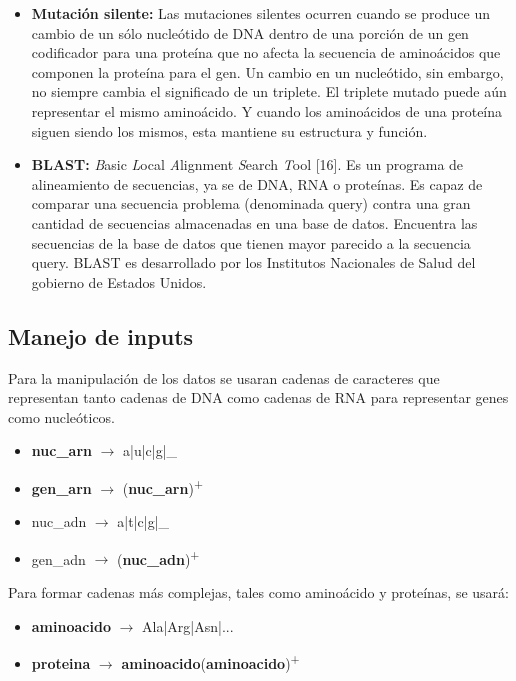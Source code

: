 \documentclass[12pt,a4paper,english,spanish]{article}
\begin{document}
\begin{itemize}
	\item \textbf{Mutación silente:} Las mutaciones silentes ocurren cuando se produce un cambio de un sólo nucleótido de DNA dentro de una porción de un 										gen codificador para una proteína que no afecta la secuencia de aminoácidos que componen la proteína para el gen. Un 										cambio en un nucleótido, sin embargo, no siempre cambia el significado de un triplete. El triplete mutado puede aún 									representar el mismo aminoácido. Y cuando los aminoácidos de una proteína siguen siendo los mismos, esta mantiene su 										estructura y función.				
	\item \textbf{BLAST:} \textit{B}asic \textit{L}ocal \textit{A}lignment \textit{S}earch \textit{T}ool [16]. Es un programa de alineamiento de secuencias, ya se de DNA, RNA o proteínas. Es capaz de comparar una secuencia problema (denominada query) contra una gran cantidad de secuencias almacenadas en una base de datos. Encuentra las secuencias de la base de datos que tienen mayor parecido a la secuencia query. BLAST es desarrollado por los Institutos Nacionales de Salud del gobierno de Estados Unidos.
\end{itemize}

\subsection{Manejo de inputs}
\par Para la manipulación de los datos se usaran cadenas de caracteres que representan tanto cadenas de DNA como cadenas de RNA para representar genes como nucleóticos.
\begin{itemize}
	\item \textbf{nuc\_arn} $\to$  a|u|c|g|\_ 
	\item \textbf{gen\_arn} $\to$ (\textbf{nuc\_arn})\textsuperscript{+}

	\item {nuc\_adn} $\to$ a|t|c|g|\_
	\item {gen\_adn} $\to$ (\textbf{nuc\_adn})\textsuperscript{+}
\end{itemize}
\par Para formar cadenas más complejas, tales como aminoácido y proteínas, se usará:
\begin{itemize}
 	\item \textbf{aminoacido} $\to$ Ala|Arg|Asn|...	
	\item \textbf{proteina} $\to$ \textbf{aminoacido}(\textbf{aminoacido})\textsuperscript{+}
\end{itemize}
\end{document}
